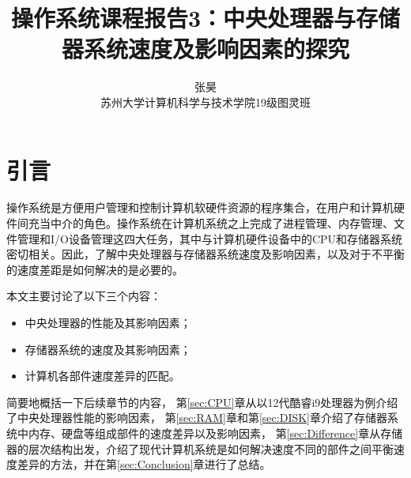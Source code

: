 \documentclass[final]{cvpr}
\begin{document}

\renewcommand{\figref}[1]{图\ref{#1}}
\renewcommand{\tabref}[1]{表\ref{#1}}
\renewcommand{\equref}[1]{式\ref{#1}}
\renewcommand{\secref}[1]{第\ref{#1}节}
\def\abstract{\centerline{\large\bf 摘要} \vspace*{12pt} \it}


\title{操作系统课程报告3：中央处理器与存储器系统速度及影响因素的探究}

\author{张昊   \\ 苏州大学计算机科学与技术学院19级图灵班}

\maketitle


\section{引言}\label{sec:Introduction}

操作系统是方便用户管理和控制计算机软硬件资源的程序集合，在用户和计算机硬件间充当中介的角色。操作系统在计算机系统之上完成了进程管理、内存管理、文件管理和I/O设备管理这四大任务，其中与计算机硬件设备中的CPU和存储器系统密切相关。因此，了解中央处理器与存储器系统速度及影响因素，以及对于不平衡的速度差距是如何解决的是必要的。

本文主要讨论了以下三个内容：

\begin{itemize}
\item 中央处理器的性能及其影响因素；
\item 存储器系统的速度及其影响因素；
\item 计算机各部件速度差异的匹配。
\end{itemize}

简要地概括一下后续章节的内容，
第\ref{sec:CPU}章从以12代酷睿i9处理器为例介绍了中央处理器性能的影响因素，
第\ref{sec:RAM}章和第\ref{sec:DISK}章介绍了存储器系统中内存、硬盘等组成部件的速度差异以及影响因素，
第\ref{sec:Difference}章从存储器的层次结构出发，介绍了现代计算机系统是如何解决速度不同的部件之间平衡速度差异的方法，并在第\ref{sec:Conclusion}章进行了总结。
\end{document}
